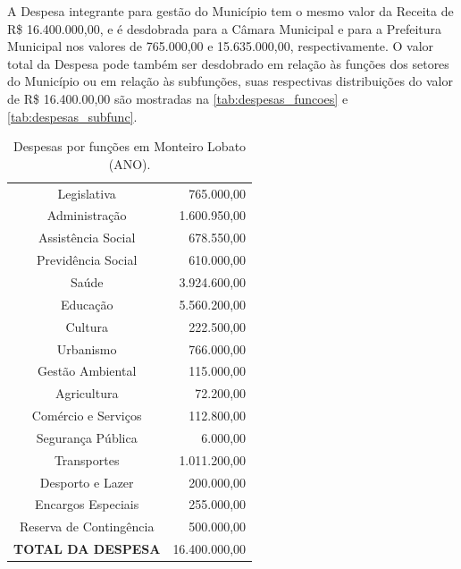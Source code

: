 A Despesa integrante para gestão do Município tem o mesmo valor da Receita de R\$ 16.400.000,00, e é desdobrada para a Câmara Municipal e para a Prefeitura Municipal nos valores de 765.000,00 e 15.635.000,00, respectivamente. O valor total da Despesa pode também ser desdobrado em relação às funções dos setores do Município ou em relação às subfunções, suas respectivas distribuições do valor de R\$ 16.400.00,00 são mostradas na \autoref{tab:despesas_funcoes} e \autoref{tab:despesas_subfunc}.

\begin{table}[htbp]
	\centering
	\caption{Despesas por funções em Monteiro Lobato (ANO).}
	\begin{tabular}{c|r}
		\rowcolor[rgb]{ .984,  .831,  .706} Legislativa & 765.000,00 \\
		\rowcolor[rgb]{ .992,  .914,  .851} Administração & 1.600.950,00 \\
		\rowcolor[rgb]{ .984,  .831,  .706} Assistência Social & 678.550,00 \\
		\rowcolor[rgb]{ .992,  .914,  .851} Previdência Social & 610.000,00 \\
		\rowcolor[rgb]{ .984,  .831,  .706} Saúde & 3.924.600,00 \\
		\rowcolor[rgb]{ .992,  .914,  .851} Educação & 5.560.200,00 \\
		\rowcolor[rgb]{ .984,  .831,  .706} Cultura & 222.500,00 \\
		\rowcolor[rgb]{ .992,  .914,  .851} Urbanismo & 766.000,00 \\
		\rowcolor[rgb]{ .984,  .831,  .706} Gestão Ambiental & 115.000,00 \\
		\rowcolor[rgb]{ .992,  .914,  .851} Agricultura & 72.200,00 \\
		\rowcolor[rgb]{ .984,  .831,  .706} Comércio e Serviços & 112.800,00 \\
		\rowcolor[rgb]{ .992,  .914,  .851} Segurança Pública & 6.000,00 \\
		\rowcolor[rgb]{ .984,  .831,  .706} Transportes & 1.011.200,00 \\
		\rowcolor[rgb]{ .992,  .914,  .851} Desporto e Lazer & 200.000,00 \\
		\rowcolor[rgb]{ .984,  .831,  .706} Encargos Especiais & 255.000,00 \\
		\rowcolor[rgb]{ .992,  .914,  .851} Reserva de Contingência & 500.000,00 \\
		\rowcolor[rgb]{ .984,  .831,  .706} \textbf{TOTAL DA DESPESA} & 16.400.000,00 \\
	\end{tabular}%
	\label{tab:despesas_funcoes}%
\end{table}%

